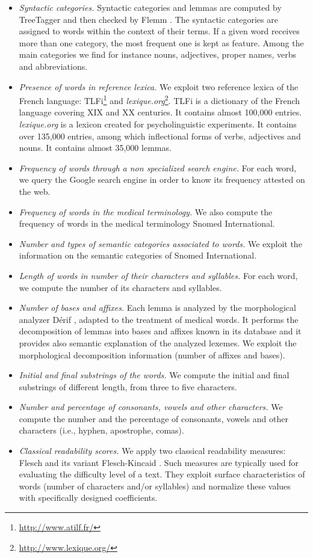 \begin{itemize}
\item {\it Syntactic categories.}  Syntactic categories and lemmas are
  computed by TreeTagger \citep{Schmid-1994} and then checked by Flemm
  \citep{Namer-TAL2000}.  The syntactic categories are assigned to
  words within the context of their terms.  If a given word receives
  more than one category, the most frequent one is kept as feature.
  Among the main categories we find for instance nouns, adjectives,
  proper names, verbs and abbreviations.
\item {\it Presence of words in reference lexica.} We exploit two
  reference lexica of the French language:
  TLFi\footnote{\url{http://www.atilf.fr/}} and {\it lexique.org}\footnote{\url{http://www.lexique.org/}}. TLFi is
  a dictionary of the French language covering XIX and XX
  centuries. It contains almost 100,000 entries. {\it lexique.org} is
  a lexicon created for psycholinguistic experiments. It contains over
  135,000 entries, among which inflectional forms of verbs, adjectives
  and nouns. It contains almost 35,000 lemmas.
\item {\it Frequency of words through a non specialized search
    engine.} For each word, we query the Google search engine in order
  to know its frequency attested on the web.
\item {\it Frequency of words in the medical terminology.} We also
  compute the frequency of words in the medical terminology Snomed
  International.
\item {\it Number and types of semantic categories associated to
    words.} We exploit the information on the semantic categories of
  Snomed International.
\item {\it Length of words in number of their characters and
    syllables.} For each word, we compute the number of its characters
  and syllables.
\item {\it Number of bases and affixes.} Each lemma is analyzed by the
  morphological analyzer D\'erif \citep{Namer-AMIA2004}, adapted to the
  treatment of medical words. It performs the decomposition of lemmas
  into bases and affixes known in its database and it provides also
  semantic explanation of the analyzed lexemes. We exploit the
  morphological decomposition information (number of affixes and
  bases).
\item {\it Initial and final substrings of the words.}  We compute the
  initial and final substrings of different length, from three to five
  characters.
\item {\it Number and percentage of consonants, vowels and other
    characters.} We compute the number and the percentage of
  consonants, vowels and other characters (i.e., hyphen, apostrophe,
  comas).
\item {\it Classical readability scores.} We apply two classical
  readability measures: Flesch \citep{Flesch1948} and its variant
  Flesch-Kincaid \citep{Kincaid-1975}. Such measures are typically used
  for evaluating the difficulty level of a text. They exploit surface
  characteristics of words (number of characters and/or syllables) and
  normalize these values with specifically designed coefficients.
\end{itemize}

